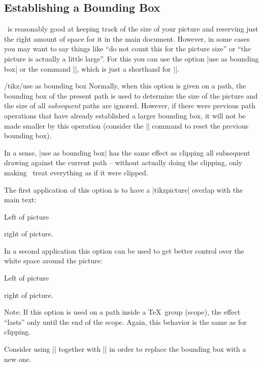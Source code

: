 \subsection{Establishing a Bounding Box}

\pgfname\ is reasonably good at keeping track of the size of your picture and
reserving just the right amount of space for it in the main document. However,
in some cases you may want to say things like ``do not count this for the
picture size'' or ``the picture is actually a little large''. For this you can
use the option |use as bounding box| or the command |\useasboundingbox|, which
is just a shorthand for ||.

\begin{key}{/tikz/use as bounding box}
    Normally, when this option is given on a path, the bounding box of the
    present path is used to determine the size of the picture and the size of
    all \emph{subsequent} paths are ignored. However, if there were previous
    path operations that have already established a larger bounding box, it
    will not be made smaller by this operation (consider the
    |\pgfresetboundingbox| command to reset the previous bounding box).

    In a sense, |use as bounding box| has the same effect as clipping all
    subsequent drawing against the current path -- without actually doing the
    clipping, only making \pgfname\ treat everything as if it were clipped.

    The first application of this option is to have a |{tikzpicture}| overlap
    with the main text:
\begin{codeexample}[pre={\begin{lateximage}},post={\end{lateximage}}]
Left of pictureright of picture.
\end{codeexample}

    In a second application this option can be used to get better control over
    the white space around the picture:
\begin{codeexample}[pre={\begin{lateximage}},post={\end{lateximage}}]
Left of picture
right of picture.
\end{codeexample}

    Note: If this option is used on a path inside a \TeX\ group (scope), the
    effect ``lasts'' only until the end of the scope. Again, this behavior is
    the same as for clipping.

    Consider using |\useasboundingbox| together with |\pgfresetboundingbox| in
    order to replace the bounding box with a new one.
\end{key}

